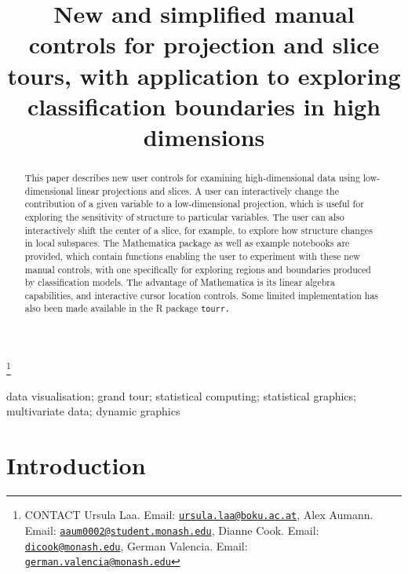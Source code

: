 \documentclass[]{interact}
\theoremstyle{plain}%
\theoremstyle{definition}
\theoremstyle{remark}
\begin{document}

\title{New and simplified manual controls for projection and slice
tours, with application to exploring classification boundaries in high
dimensions}


\author{
}

\thanks{CONTACT Ursula
Laa. Email: \href{mailto:ursula.laa@boku.ac.at}{\nolinkurl{ursula.laa@boku.ac.at}}, Alex
Aumann. Email: \href{mailto:aaum0002@student.monash.edu}{\nolinkurl{aaum0002@student.monash.edu}}, Dianne
Cook. Email: \href{mailto:dicook@monash.edu}{\nolinkurl{dicook@monash.edu}}, German
Valencia. Email: \href{mailto:german.valencia@monash.edu}{\nolinkurl{german.valencia@monash.edu}}}

\maketitle

\begin{abstract}
This paper describes new user controls for examining high-dimensional
data using low-dimensional linear projections and slices. A user can
interactively change the contribution of a given variable to a
low-dimensional projection, which is useful for exploring the
sensitivity of structure to particular variables. The user can also
interactively shift the center of a slice, for example, to explore how
structure changes in local subspaces. The Mathematica package as well as
example notebooks are provided, which contain functions enabling the
user to experiment with these new manual controls, with one specifically
for exploring regions and boundaries produced by classification models.
The advantage of Mathematica is its linear algebra capabilities, and
interactive cursor location controls. Some limited implementation has
also been made available in the R package \tt{tourr}. 
\end{abstract}

\begin{keywords}
data visualisation; grand tour; statistical computing; statistical
graphics; multivariate data; dynamic graphics
\end{keywords}

\hypertarget{introduction}{%
\section{Introduction}\label{introduction}}
\end{document}
